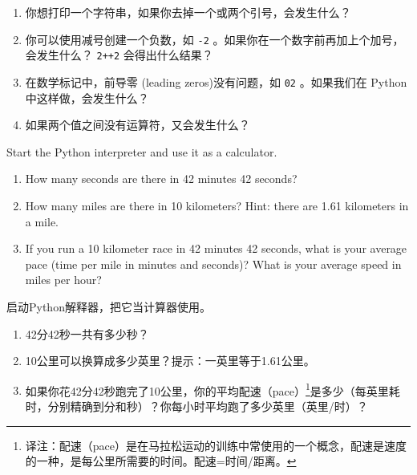 \begin{exercise}
\begin{enumerate}
\item 你想打印一个字符串，如果你去掉一个或两个引号，会发生什么？

\item 你可以使用减号创建一个负数，如 \lstinline{-2} 。如果你在一个数字前再加上个加号，会发生什么？ \lstinline{2++2} 会得出什么结果？

\item 在数学标记中，前导零 (leading zeros)没有问题，如 \lstinline{02} 。如果我们在 Python 中这样做，会发生什么？

\item 如果两个值之间没有运算符，又会发生什么？

\end{enumerate}

\end{exercise}



\begin{exercise}

Start the Python interpreter and use it as a calculator.

\begin{enumerate}

\item How many seconds are there in 42 minutes 42 seconds?

\item How many miles are there in 10 kilometers?  Hint: there are 1.61
  kilometers in a mile.

\item If you run a 10 kilometer race in 42 minutes 42 seconds, what is
  your average pace (time per mile in minutes and seconds)?  What is
  your average speed in miles per hour?


\end{enumerate}

启动Python解释器，把它当计算器使用。

\begin{enumerate}

\item 42分42秒一共有多少秒？

\item 10公里可以换算成多少英里？提示：一英里等于1.61公里。

\item 如果你花42分42秒跑完了10公里，你的平均配速（pace）\footnote{译注：配速（pace）是在马拉松运动的训练中常使用的一个概念，配速是速度的一种，是每公里所需要的时间。配速=时间/距离。}是多少（每英里耗时，分别精确到分和秒）？你每小时平均跑了多少英里（英里/时）？

  
  

\end{enumerate}

\end{exercise}